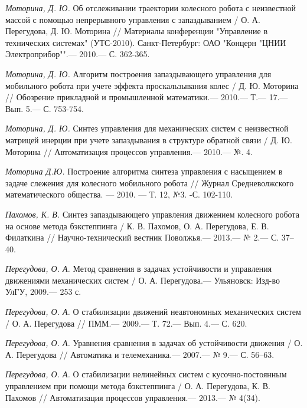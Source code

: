 \begin{thebibliography}{10}
	{\it Моторина, Д. Ю.} Об отслеживании траектории колесного робота с неизвестной массой с помощью непрерывного управления с запаздыванием / О. А. Перегудова, Д. Ю. Моторина // Материалы конференции "Управление в технических системах" (УТС-2010). Санкт-Петербург: ОАО "Концерн "ЦНИИ Электроприбор"".—  2010.— С. 362-365.
	
	{\it Моторина, Д. Ю.} Алгоритм построения запаздывающего управления для мобильного робота при учете эффекта проскальзывания колес / Д. Ю. Моторина // Обозрение прикладной и промышленной математики.—  2010.— Т.— 17.— Вып. 5.— С. 753-754.
	
	{\it Моторина, Д. Ю.} Синтез управления для механических систем с неизвестной матрицей инерции при учете запаздывания в структуре обратной связи / Д. Ю. Моторина // Автоматизация процессов управления.—  2010.— №. 4.
	
	{\it Моторина Д.Ю.} Построение алгоритма синтеза управления с насыщением в задаче слежения для колесного мобильного робота // Журнал Средневолжского математического общества. — 2010. — Т. 12, №3. -С. 102-110.
	
	
	{\it Пахомов, К. В.} Синтез запаздывающего управления движением колесного робота на основе метода бэкстеппинга /
	К. В. Пахомов, О. А. Перегудова, Е. В. Филаткина // Научно-технический вестник Поволжья.— 2013.— № 2.— С. 37–40.
	
	{\it Перегудова, О. А.} Метод сравнения в задачах устойчивости и управления движениями
	механических систем / О. А. Перегудова.— Ульяновск: Изд-во УлГУ, 2009.— 253 с.
	
	{\it Перегудова, О. А.} О стабилизации движений неавтономных механических систем / О. А. Перегудова // ПММ.—  2009.— Т. 72.— Вып. 4.— С. 620.
	
	{\it Перегудова, О. А.} Уравнения сравнения в задачах об устойчивости движения / О. А. Перегудова // Автоматика и телемеханика.—  2007.— № 9.— С. 56–63.
	
	{\it Перегудова, О. А.} О стабилизации нелинейных систем с кусочно-постоянным управлением при помощи метода бэкстеппинга / О. А. Перегудова, К. В. Пахомов // Автоматизация процессов управления.—  2013.— № 4(34).
	

\end{thebibliography}
